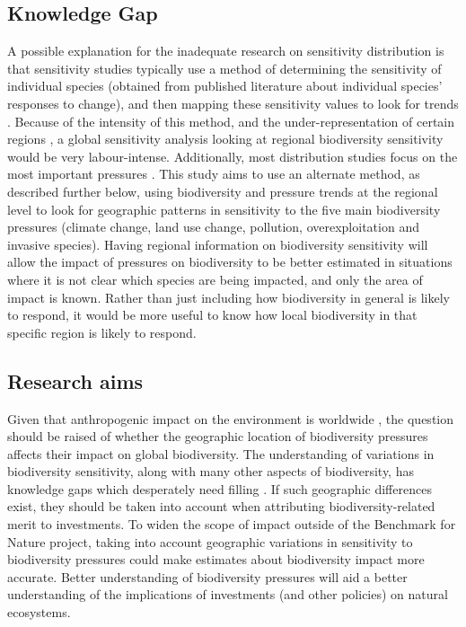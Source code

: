 \documentclass[11pt, a4paper, titlepage]{article}
\begin{document}
   	\subsection*{Knowledge Gap}
 	A possible explanation for the inadequate research on sensitivity distribution is that sensitivity studies typically use a method of determining the sensitivity of individual species (obtained from published literature about individual species' responses to change), and then mapping these sensitivity values to look for trends \citep{louette2010bioscore}. Because of the intensity of this method, and the under-representation of certain regions \citep{collen2008tropical}, a global sensitivity analysis looking at regional biodiversity sensitivity would be very labour-intense. Additionally, most distribution studies focus on the most important pressures \citep{ferrier2016summary}. This study aims to use an alternate method, as described further below, using biodiversity and pressure trends at the regional level to look for geographic patterns in sensitivity to the five main biodiversity pressures (climate change, land use change, pollution, overexploitation and invasive species). Having regional information on biodiversity sensitivity will allow the impact of pressures on biodiversity to be better estimated in situations where it is not clear which species are being impacted, and only the area of impact is known. Rather than just including how biodiversity in general is likely to respond, it would be more useful to know how local biodiversity in that specific region is likely to respond. 
   	 

   	\subsection*{Research aims}
   	
   	 Given that anthropogenic impact on the environment is worldwide \citep{plumptre2021might}, the question should be raised of whether the geographic location of biodiversity pressures affects their impact on global biodiversity. The understanding of variations in biodiversity sensitivity, along with many other aspects of biodiversity, has knowledge gaps which desperately need filling \citep{pereira2012global}. If such geographic differences exist, they should be taken into account when attributing biodiversity-related merit to investments. To widen the scope of impact outside of the Benchmark for Nature project, taking into account geographic variations in sensitivity to biodiversity pressures could make estimates about biodiversity impact more accurate. Better understanding of biodiversity pressures will aid a better understanding of the implications of investments (and other policies) on natural ecosystems.
   	 
\end{document}
